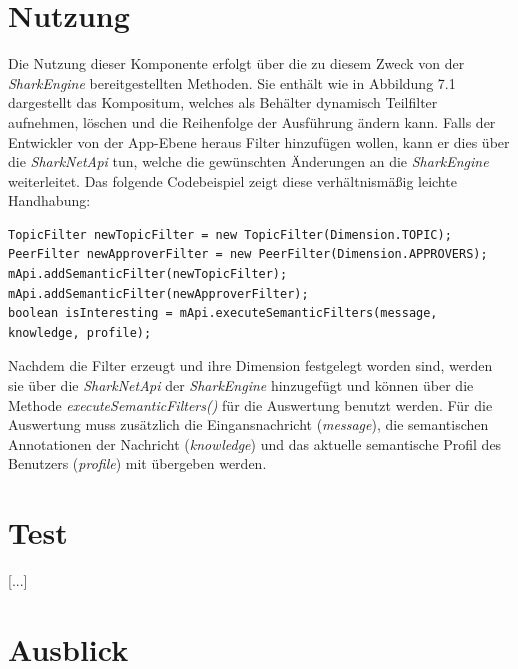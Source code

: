 \section{Nutzung}
Die Nutzung dieser Komponente erfolgt über die zu diesem Zweck von der \textit{SharkEngine} bereitgestellten Methoden. Sie enthält wie in Abbildung 7.1 dargestellt das Kompositum, welches als Behälter dynamisch Teilfilter aufnehmen, löschen und die Reihenfolge der Ausführung ändern kann. Falls der Entwickler von der App-Ebene heraus Filter hinzufügen wollen, kann er dies über die \textit{SharkNetApi} tun, welche die gewünschten Änderungen an die \textit{SharkEngine} weiterleitet. Das folgende Codebeispiel zeigt diese verhältnismäßig leichte Handhabung:
 \lstset{language=Java, caption=Beispiel für die Anwendung der Filter, label=DescriptiveLabel, numbers=left, numbersep=1em, breaklines=true, basicstyle=\small}
 \begin{lstlisting}
TopicFilter newTopicFilter = new TopicFilter(Dimension.TOPIC);
PeerFilter newApproverFilter = new PeerFilter(Dimension.APPROVERS);
mApi.addSemanticFilter(newTopicFilter);
mApi.addSemanticFilter(newApproverFilter);
boolean isInteresting = mApi.executeSemanticFilters(message, knowledge, profile);
 \end{lstlisting}
Nachdem die Filter erzeugt und ihre Dimension festgelegt worden sind, werden sie über die \textit{SharkNetApi} der \textit{SharkEngine} hinzugefügt und können über die Methode \textit{executeSemanticFilters()} für die Auswertung benutzt werden. Für die Auswertung muss zusätzlich die Eingansnachricht (\textit{message}), die semantischen Annotationen der Nachricht (\textit{knowledge}) und das aktuelle semantische Profil des Benutzers (\textit{profile}) mit übergeben werden.



\section{Test}
[...]


\section{Ausblick}
